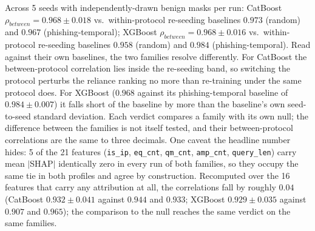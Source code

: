 Across 5 seeds with independently-drawn benign masks per run: CatBoost $\rho_{between} = 0.968\pm0.018$ vs.\ within-protocol re-seeding baselines $0.973$ (random) and $0.967$ (phishing-temporal); XGBoost $\rho_{between} = 0.968\pm0.016$ vs.\ within-protocol re-seeding baselines $0.958$ (random) and $0.984$ (phishing-temporal). Read against their own baselines, the two families resolve differently. For CatBoost the between-protocol correlation lies inside the re-seeding band, so switching the protocol perturbs the reliance ranking no more than re-training under the same protocol does. For XGBoost ($0.968$ against its phishing-temporal baseline of $0.984 \pm 0.007$) it falls short of the baseline by more than the baseline's own seed-to-seed standard deviation. Each verdict compares a family with its own null; the difference between the families is not itself tested, and their between-protocol correlations are the same to three decimals. One caveat the headline number hides: 5 of the 21 features (\texttt{is\_ip}, \texttt{eq\_cnt}, \texttt{qm\_cnt}, \texttt{amp\_cnt}, \texttt{query\_len}) carry mean $|$SHAP$|$ identically zero in every run of both families, so they occupy the same tie in both profiles and agree by construction. Recomputed over the 16 features that carry any attribution at all, the correlations fall by roughly $0.04$ (CatBoost $0.932\pm0.041$ against $0.944$ and $0.933$; XGBoost $0.929\pm0.035$ against $0.907$ and $0.965$); the comparison to the null reaches the same verdict on the same families.%
